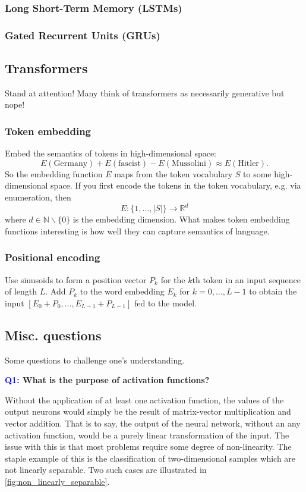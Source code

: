 \documentclass[11pt]{article}
\begin{document}
\subsubsection{Long Short-Term Memory (LSTMs)}
\TODO{} 

\subsubsection{Gated Recurrent Units (GRUs)}
\TODO{} 

\subsection{Transformers}
\TODO{} Stand at attention! Many think of transformers as necessarily generative but nope!

\subsubsection{Token embedding}
\TODO{} Embed the semantics of tokens in high-dimensional space:
$$
E(\text{Germany})
+E(\text{fascist})
-E(\text{Mussolini})
\approx
E(\text{Hitler}).
$$
So the embedding function $E$ maps from the token vocabulary $S$ to some high-dimensional space. If you first encode the tokens in the token vocabulary, e.g. via enumeration, then
$$
E:\{1,\dots,|S|\}\to\mathbb{R}^d
$$
where $d\in\mathbb{N}\backslash\{0\}$ is the embedding dimension. What makes token embedding functions interesting is how well they can capture semantics of language.

\subsubsection{Positional encoding}
\TODO{} Use sinusoids to form a position vector $P_k$ for the $k$th token in an input sequence of length $L$. Add $P_k$ to the word embedding $E_k$ for $k=0,\dots,L-1$ to obtain the input $[E_0+P_0,\dots,E_{L-1}+P_{L-1}]$ fed to the model.

\subsection{Misc. questions}

Some questions to challenge one's understanding.

\begin{center}
    \textbf{\textcolor{blue}{Q1:} What is the purpose of activation functions?}
\end{center}
Without the application of at least one activation function, the values of the output neurons would simply be the result of matrix-vector multiplication and vector addition. That is to say, the output of the neural network, without an any activation function, would be a purely linear transformation of the input. The issue with this is that most problems require some degree of non-linearity. The staple example of this is the classification of two-dimensional samples which are not linearly separable. Two such cases are illustrated in \autoref{fig:non_linearly_separable}.
\end{document}
